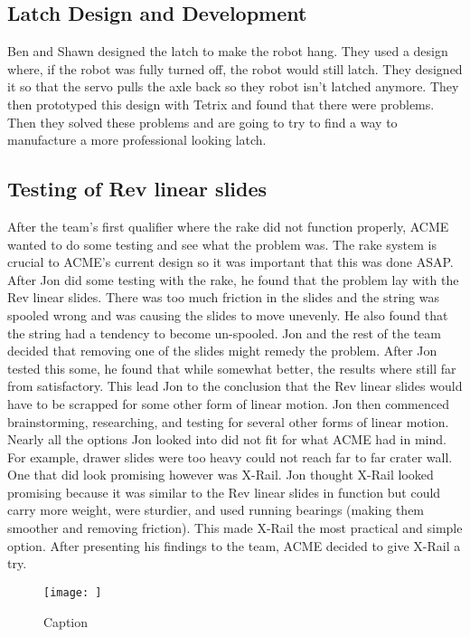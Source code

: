 \documentclass{article}
\begin{document}
\subsection{Latch Design and Development}
Ben and Shawn designed the latch to make the robot hang. They used a design where, if the robot was fully turned off, the robot would still latch. They designed it so that the servo pulls the axle back so they robot isn't latched anymore. They then prototyped this design with Tetrix and found that there were problems. Then they solved these problems and are going to try to find a way to manufacture a more professional looking latch.

\subsection{Testing of Rev linear slides}
After the team's first qualifier where the rake did not function properly, ACME wanted to do some testing and see what the problem was. The rake system is crucial to ACME's current design so it was important that this was done ASAP. After Jon did some testing with the rake, he found that the problem lay with the Rev linear slides. There was too much friction in the slides and the string was spooled wrong and was causing the slides to move unevenly. He also found that the string had a tendency to become un-spooled. Jon and the rest of the team decided that removing one of the slides might remedy the problem. After Jon tested this some, he found that while somewhat better, the results where still far from satisfactory. This lead Jon to the conclusion that the Rev linear slides would have to be scrapped for some other form of linear motion. Jon then commenced brainstorming, researching, and testing for several other forms of linear motion. Nearly all the options Jon looked into did not fit for what ACME had in mind. For example, drawer slides were too heavy could not reach far to far crater wall. One that did look promising however was X-Rail. Jon thought X-Rail looked promising because it was similar to the Rev linear slides in function but could carry more weight, were sturdier, and used running bearings (making them smoother and removing friction). This made X-Rail the most practical and simple option. After presenting his findings to the team, ACME decided to give X-Rail a try. 

\begin{figure}
    \centering
    \texttt{[image: ]}
    \caption{Caption}
    \label{fig:my_label}
\end{figure}
\end{document}
